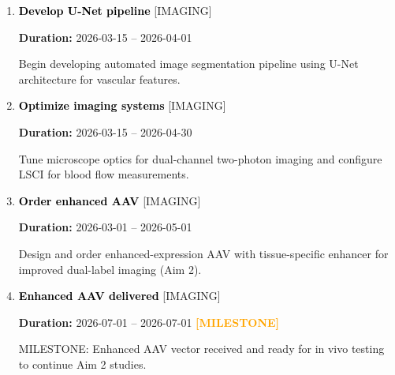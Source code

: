 \documentclass[landscape,a4paper]{article}
\begin{document}
\begin{enumerate}[leftmargin=1.5cm, itemsep=1em]
    \item \textcolor{black}{\textbf{\large Develop U-Net pipeline}}
          \hfill \textcolor{black!60}{\small [IMAGING]}
          
          \vspace{0.2em}
          \textcolor{black!70}{\textbf{Duration:} 2026-03-15 -- 2026-04-01}

          \vspace{0.4em}
          \begin{minipage}[t]{0.9\textwidth}
          \textcolor{black!85}{Begin developing automated image segmentation pipeline using U-Net architecture for vascular features.}
          \end{minipage}


    \item \textcolor{black}{\textbf{\large Optimize imaging systems}}
          \hfill \textcolor{black!60}{\small [IMAGING]}
          
          \vspace{0.2em}
          \textcolor{black!70}{\textbf{Duration:} 2026-03-15 -- 2026-04-30}

          \vspace{0.4em}
          \begin{minipage}[t]{0.9\textwidth}
          \textcolor{black!85}{Tune microscope optics for dual-channel two-photon imaging and configure LSCI for blood flow measurements.}
          \end{minipage}


    \item \textcolor{black}{\textbf{\large Order enhanced AAV}}
          \hfill \textcolor{black!60}{\small [IMAGING]}
          
          \vspace{0.2em}
          \textcolor{black!70}{\textbf{Duration:} 2026-03-01 -- 2026-05-01}

          \vspace{0.4em}
          \begin{minipage}[t]{0.9\textwidth}
          \textcolor{black!85}{Design and order enhanced-expression AAV with tissue-specific enhancer for improved dual-label imaging (Aim 2).}
          \end{minipage}


    \item \textcolor{black}{\textbf{\large Enhanced AAV delivered}}
          \hfill \textcolor{black!60}{\small [IMAGING]}
          
          \vspace{0.2em}
          \textcolor{black!70}{\textbf{Duration:} 2026-07-01 -- 2026-07-01}
          \textcolor{orange}{\textbf{ [MILESTONE]}}\n
          \vspace{0.4em}
          \begin{minipage}[t]{0.9\textwidth}
          \textcolor{black!85}{MILESTONE: Enhanced AAV vector received and ready for in vivo testing to continue Aim 2 studies.}
          \end{minipage}



\end{enumerate}
\end{document}
